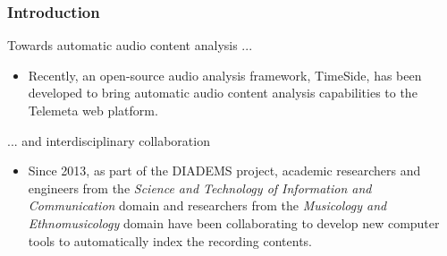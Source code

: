 \documentclass[final, hyperref, table]{beamer}
\begin{document}
\begin{frame}\frametitle{Introduction}
  

\begin{block}{Towards automatic audio content analysis ...}
  \begin{itemize}
  \item Recently, an open-source \alert{audio analysis framework},
    TimeSide, has been developed to bring automatic audio content
    analysis capabilities to the Telemeta web platform.
  \end{itemize}

\end{block}
\begin{block}{... and interdisciplinary collaboration}
  \begin{itemize}
  \item Since 2013, as part of the DIADEMS project, academic researchers and engineers from the \emph{Science and Technology of Information and Communication} domain and researchers from the \emph{Musicology and Ethnomusicology} domain have been collaborating to develop new computer tools to \alert{automatically index} the recording contents.%
  \end{itemize}
  
\end{block}

\end{frame}
\end{document}
